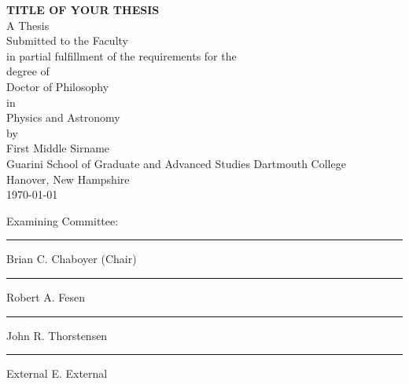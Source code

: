 \begin{titlepage}
 \begin{center}
  \MakeUppercase{\bf title of your thesis} \\ %
  A Thesis                 \\
  Submitted to the Faculty \\
  in partial fulfillment of the requirements for the \\
  degree of              \\
  Doctor of Philosophy   \\   %
  in                     \\
  Physics and Astronomy  \\   %
  by                     \\
  First Middle Sirname   \\   %
  Guarini School of Graduate and Advanced Studies
  Dartmouth College      \\
  Hanover, New Hampshire \\
  \today
 \end{center}
 \vspace{\baselineskip}
 
 \vspace*{\fill}
 
 \begin{minipage}[b]{\linewidth}
 
    \begin{flushright}
        
        \begin{minipage}[b]{0.45\linewidth}
            \begin{center}
                Examining Committee:
            \end{center}
            \vspace{0.5in}
            \hrule \vspace{0.1in}
            Brian C. Chaboyer (Chair) \\ \vspace{0.3in} %
            \hrule \vspace{0.1in}
            Robert A. Fesen \\ \vspace{0.3in}           %
            \hrule \vspace{0.1in}
            John R. Thorstensen \\ \vspace{0.3in}       %
            \hrule \vspace{0.1in} 
            External E. External                        %
        \end{minipage}
    \end{flushright}
 

\end{minipage}
\end{titlepage}
